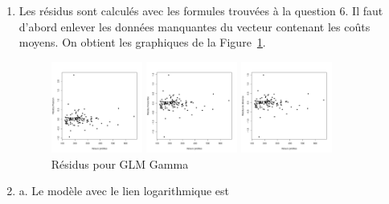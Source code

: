 \begin{solution}{2.8}
\begin{enumerate}
\item Les résidus sont calculés avec les formules trouvées à la question 6. Il faut d'abord enlever les données manquantes du vecteur contenant les coûts moyens. On obtient les graphiques de la Figure~\ref{fig:glm:residuals}.

\begin{figure}
\begin{center}
\begin{knitrout}
\color{fgcolor}
\includegraphics[width=3cm,height=3cm]{figure/unnamed-chunk-7-1}

\includegraphics[width=3cm,height=3cm]{figure/unnamed-chunk-7-2}

\includegraphics[width=3cm,height=3cm]{figure/unnamed-chunk-7-3}

\end{knitrout}
\caption{Résidus pour GLM Gamma}\label{fig:glm:residuals}
\end{center}
\end{figure}

\item a. Le modèle avec le lien logarithmique est


\end{enumerate}
\end{solution}
